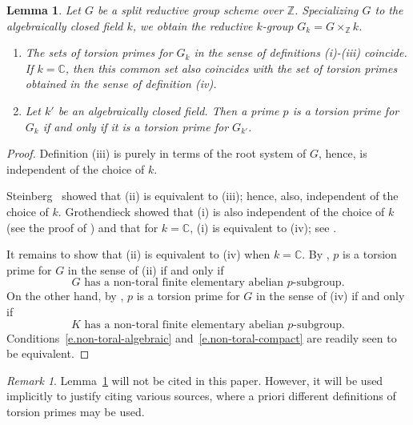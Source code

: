 \documentclass[12pt]{amsart}
\numberwithin{equation}{section}
\newtheorem{lemma}[theorem]{Lemma}
\theoremstyle{remark}
\newtheorem{remark}[theorem]{Remark}
\newcommand{\bZ}{\mathbb{Z}}
\begin{document}
\begin{lemma} \label{lem.torsion-primes}
Let $G$ be a split reductive group scheme over $\bZ$. Specializing $G$ to the algebraically closed field $k$, we obtain the reductive $k$-group $G_k = G \times_{\bZ} k$.

\begin{enumerate}
    \item The sets of torsion primes for $G_k$ in the sense of definitions {\rm (i)}-{\rm (iii)}  coincide. If $k=\mathbb C$, then this common set also coincides with the set of torsion primes obtained in the sense of definition {\rm (iv)}.
    \item Let $k'$ be an algebraically closed field. Then a prime $p$ is a torsion prime for $G_k$ if and only if it is a torsion prime for $G_{k'}$.  
\end{enumerate}
\end{lemma}

\begin{proof}
Definition (iii) is purely in terms of the root system of $G$, hence, is independent of the choice of $k$.

Steinberg~\cite[Lemma 2.5]{steinberg-torsion}  showed that (ii) is equivalent to (iii); hence, also, independent of the choice of $k$.  Grothendieck showed that (i) is also independent of the choice of $k$ (see the proof of \cite[Theorem 3]{grothendieck-special}) and that for $k = \mathbb C$, (i) is equivalent to (iv); see \cite[Theorem 4]{grothendieck-special}. 

It remains to show that (ii) is equivalent to (iv) when $k = \mathbb C$. By \cite[Theorem 2.28]{steinberg-torsion}, 
$p$ is a torsion prime for $G$ in the sense of (ii) if and only if 
\begin{equation} \label{e.non-toral-algebraic}
\text{$G$ has a non-toral finite elementary abelian $p$-subgroup.}
\end{equation}
On the other hand, by \cite[Theorem 2.28]{borel-tohoku}, $p$ is 
a torsion prime for $G$ in the sense of (iv) if and only if 
\begin{equation} \label{e.non-toral-compact}
\text{$K$ has a non-toral finite elementary abelian $p$-subgroup.}
\end{equation}
Conditions~\eqref{e.non-toral-algebraic} and~\eqref{e.non-toral-compact} are readily seen to be equivalent.
\end{proof}

\begin{remark} Lemma~\ref{lem.torsion-primes} will not be cited in this paper. However, it will be used implicitly to justify citing various sources, where a priori different definitions of torsion primes may be used.
\end{remark}
\end{document}
